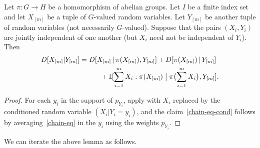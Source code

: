   \begin{lemma}\label{multidist-chain-rule-cond}
    Let $\pi \colon G \to H$ be a homomorphism of abelian groups.
    Let $I$ be a finite index set and let $X_{[m]}$ be a tuple of $G$-valued random variables.
    Let $Y_{[m]}$ be another tuple of random variables (not necessarily $G$-valued).
    Suppose that the pairs $(X_i, Y_i)$ are jointly independent of one another (but $X_i$ need not be independent of $Y_i$).
    Then
    \begin{align}\nonumber
        D[ X_{[m]} | Y_{[m]} ] &=  D[ X_{[m]} \,|\, \pi(X_{[m]}), Y_{[m]}] + D[ \pi(X_{[m]}) \,|\, Y_{[m]}] \\
         &\quad\qquad + \mathbb{I}[ \sum_{i=1}^m X_i : \pi(X_{[m]}) \; \big| \;  \pi\bigl(\sum_{i=1}^m X_i \bigr), Y_{[m]} ].\label{chain-eq-cond}
    \end{align}
  \end{lemma}

  \begin{proof}
  For each $y_i$ in the support of $p_{Y_i}$, apply  with $X_i$ replaced by the conditioned random variable $(X_i|Y_i=y_i)$, and the claim~\eqref{chain-eq-cond} follows by averaging~\eqref{chain-eq} in the $y_i$ using the weights $p_{Y_i}$.
  \end{proof}

  We can iterate the above lemma as follows.

